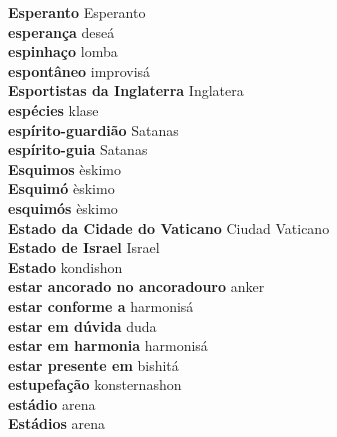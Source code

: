 \textbf{ Esperanto  } Esperanto \\
\textbf{ esperança  } deseá \\
\textbf{ espinhaço  } lomba \\
\textbf{ espontâneo  } improvisá \\
\textbf{ Esportistas da Inglaterra  } Inglatera \\
\textbf{ espécies  } klase \\
\textbf{ espírito-guardião  } Satanas \\
\textbf{ espírito-guia  } Satanas \\
\textbf{ Esquimos  } èskimo \\
\textbf{ Esquimó  } èskimo \\
\textbf{ esquimós  } èskimo \\
\textbf{ Estado da Cidade do Vaticano  } Ciudad Vaticano \\
\textbf{ Estado de Israel  } Israel \\
\textbf{ Estado  } kondishon \\
\textbf{ estar ancorado no ancoradouro  } anker \\
\textbf{ estar conforme a  } harmonisá \\
\textbf{ estar em dúvida  } duda \\
\textbf{ estar em harmonia  } harmonisá \\
\textbf{ estar presente em  } bishitá \\
\textbf{ estupefação  } konsternashon \\
\textbf{ estádio  } arena \\
\textbf{ Estádios  } arena \\
